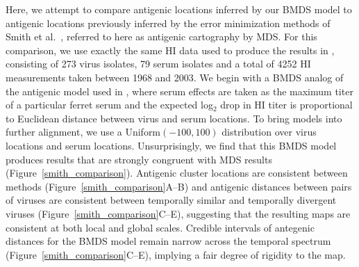 \documentclass[11pt,oneside,letterpaper]{article}
\begin{document}
Here, we attempt to compare antigenic locations inferred by our BMDS model to antigenic locations previously inferred by the error minimization methods of Smith et al.\ \cite{Smith04}, referred to here as antigenic cartography by MDS.
For this comparison, we use exactly the same HI data used to produce the results in \cite{Smith04}, consisting of 273 virus isolates, 79 serum isolates and a total of 4252 HI measurements taken between 1968 and 2003.
We begin with a BMDS analog of the antigenic model used in \cite{Smith04}, where serum effects are taken as the maximum titer of a particular ferret serum and the expected log$_2$ drop in HI titer is proportional to Euclidean distance between virus and serum locations.
To bring models into further alignment, we use a Uniform$(-100,100)$ distribution over virus locations and serum locations.
Unsurprisingly, we find that this BMDS model produces results that are strongly congruent with MDS results (Figure~\ref{smith_comparison}).
Antigenic cluster locations are consistent between methods (Figure~\ref{smith_comparison}A--B) and antigenic distances between pairs of viruses are consistent between temporally similar and temporally divergent viruses (Figure~\ref{smith_comparison}C--E), suggesting that the resulting maps are consistent at both local and global scales.
Credible intervals of antegenic distances for the BMDS model remain narrow across the temporal spectrum (Figure~\ref{smith_comparison}C--E), implying a fair degree of rigidity to the map.
\end{document}
